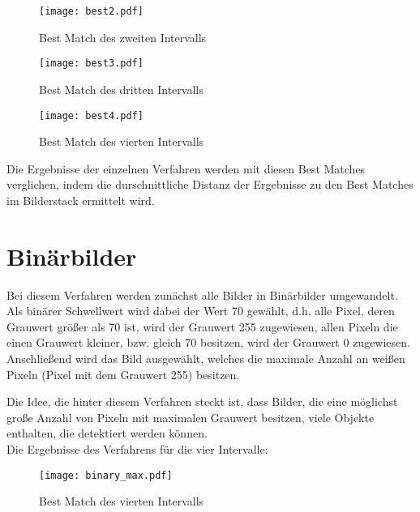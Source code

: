 \begin{figure}[H]
  \begin{center}
    \texttt{[image: best2.pdf]}
    \caption{Best Match des zweiten Intervalls}
    \label{fig:bestmatch2}
  \end{center}
\end{figure}

\begin{figure}[H]
  \begin{center}
    \texttt{[image: best3.pdf]}
    \caption{Best Match des dritten Intervalls}
    \label{fig:bestmatch3}
  \end{center}
\end{figure}

\begin{figure}[H]
  \begin{center}
    \texttt{[image: best4.pdf]}
    \caption{Best Match des vierten Intervalls}
    \label{fig:bestmatch4}
  \end{center}
\end{figure}

Die Ergebnisse der einzelnen Verfahren werden mit diesen Best Matches verglichen, indem die durschnittliche Distanz der Ergebnisse zu den Best Matches im Bilderstack ermittelt wird. 

\section{Binärbilder}
Bei diesem Verfahren werden zunächst alle Bilder in Binärbilder umgewandelt. Als binärer Schwellwert wird dabei der Wert 70 gewählt, d.h. alle Pixel, deren Grauwert größer als 70 ist, wird der Grauwert 255 zugewiesen, allen Pixeln die einen Grauwert kleiner, bzw. gleich 70 besitzen, wird der Grauwert 0 zugewiesen. Anschließend wird das Bild ausgewählt, welches die maximale Anzahl an weißen Pixeln (Pixel mit dem Grauwert 255) besitzen.

Die Idee, die hinter diesem Verfahren steckt ist, dass Bilder, die eine möglichst große Anzahl von Pixeln mit maximalen Grauwert besitzen, viele Objekte enthalten, die detektiert werden können. \\

Die Ergebnisse des Verfahrens für die vier Intervalle:
\begin{figure}[H]
  \begin{center}
    \texttt{[image: binary\_max.pdf]}
    \caption{Best Match des vierten Intervalls}
    \label{fig:bestmatch4}
  \end{center}
\end{figure}

